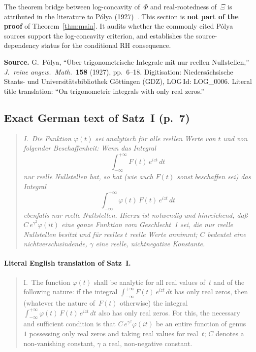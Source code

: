 \documentclass[11pt]{article}
\theoremstyle{definition}
\theoremstyle{remark}
\begin{document}
The theorem bridge between log-concavity of~$\Phi$ and real-rootedness of~$\Xi$ is
attributed in the literature to P\'{o}lya (1927)~\cite{polya1927}.
This section is \textbf{not part of the proof} of Theorem~\ref{thm:main}.
It audits whether the commonly cited P\'{o}lya sources support the log-concavity
criterion, and establishes the source-dependency status for the conditional
RH consequence.

\medskip
\noindent\textbf{Source.}
G.\ P\'{o}lya, ``\"{U}ber trigonometrische Integrale mit nur reellen Nullstellen,''
\textit{J.\ reine angew.\ Math.}\ \textbf{158} (1927), pp.~6--18.
Digitisation: Niedersächsische Staats- und Universitätsbibliothek Göttingen (GDZ),
LOG\,Id: LOG\_0006.
Literal title translation: ``On trigonometric integrals with only real zeros.''

\subsection{Exact German text of Satz~I (p.~7)}\label{sec:satzi}

\begin{quote}\itshape
I.\ Die Funktion $\varphi(t)$ sei analytisch f\"{u}r alle reellen Werte von $t$
und von folgender Beschaffenheit: Wenn das Integral
\[\int_{-\infty}^{+\infty} F(t)\,e^{izt}\,dt\]
nur reelle Nullstellen hat, so hat (wie auch $F(t)$ sonst beschaffen sei) das Integral
\[\int_{-\infty}^{+\infty} \varphi(t)\,F(t)\,e^{izt}\,dt\]
ebenfalls nur reelle Nullstellen.  Hierzu ist notwendig und hinreichend,
da\ss{} $C\,e^{\gamma^{2}}\varphi(it)$ eine ganze Funktion vom Geschlecht~1 sei,
die nur reelle Nullstellen besitzt und f\"{u}r reelles $t$ reelle Werte annimmt;
$C$ bedeutet eine nichtverschwindende, $\gamma$ eine reelle, nichtnegative Konstante.
\end{quote}

\paragraph{Literal English translation of Satz~I.}
\begin{quote}
I.\ The function $\varphi(t)$ shall be analytic for all real values of~$t$ and of
the following nature: if the integral
$\int_{-\infty}^{+\infty} F(t)\,e^{izt}\,dt$ has only real zeros,
then (whatever the nature of~$F(t)$ otherwise) the integral
$\int_{-\infty}^{+\infty} \varphi(t)\,F(t)\,e^{izt}\,dt$ also has only real zeros.
For this, the necessary and sufficient condition is that
$C\,e^{\gamma^{2}}\varphi(it)$ be an entire function of genus~$1$
possessing only real zeros and taking real values for real~$t$;
$C$ denotes a non-vanishing constant, $\gamma$ a real, non-negative constant.
\end{quote}
\end{document}
